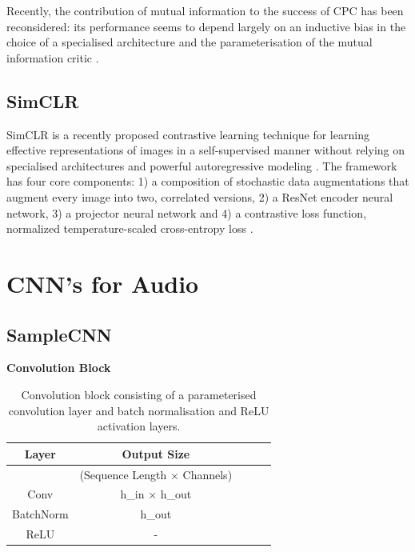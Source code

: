 Recently, the contribution of mutual information to the success of CPC has been reconsidered: its performance seems to depend largely on an inductive bias in the choice of a specialised architecture and the parameterisation of the mutual information critic \cite{Tschannen2020OnMI}.





\subsection{SimCLR}
SimCLR is a recently proposed contrastive learning technique for learning effective representations of images in a self-supervised manner without relying on specialised architectures and powerful autoregressive modeling \cite{chen_simple_2020}.
The framework has four core components: 1) a composition of stochastic data augmentations that augment every image into two, correlated versions, 2) a ResNet encoder neural network, 3) a projector neural network and 4) a contrastive loss function, normalized temperature-scaled cross-entropy loss \cite{chen_simple_2020}.


\section{CNN's for Audio}

\subsection{SampleCNN}


\begin{table}
    \centering
    \textbf{Convolution Block} \\
    \begin{tabular}{ccccc}
        \toprule Layer & Output Size \\\hline
        & (Sequence Length $\times$ Channels) \\
        Conv & h\_in $\times$ h\_out \\
        BatchNorm & h\_out \\
        ReLU & - \\
        \bottomrule
    \end{tabular}
    \caption{Convolution block consisting of a parameterised convolution layer and batch normalisation and ReLU activation layers.}
    \label{tab:conv_block}
\end{table}

